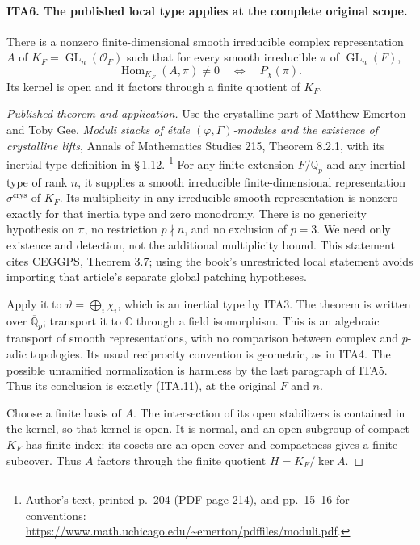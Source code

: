 \documentclass[11pt,a4paper]{article}
\numberwithin{equation}{section}
\theoremstyle{remark}\newtheorem{remark}[theorem]{Remark}
\begin{document}
\paragraph{ITA6. The published local type applies at the complete original scope.}
\label{claim:ITA6}
There is a nonzero finite-dimensional smooth irreducible complex
representation $A$ of $K_F=\operatorname{GL}_n(\mathcal O_F)$
such that for every smooth irreducible $\pi$ of
$\operatorname{GL}_n(F)$,
\[
             \operatorname{Hom}_{K_F}(A,\pi)\ne0
                         \quad\Longleftrightarrow\quad P_\chi(\pi).
                                                               \tag{ITA.11}
\]
Its kernel is open and it factors through a finite quotient of
$K_F$.
\begin{proof}[Published theorem and application]
Use the crystalline part of Matthew Emerton and Toby Gee,
\emph{Moduli stacks of \textup{\'etale} $(\varphi,\Gamma)$-modules
and the existence of crystalline lifts}, Annals of Mathematics
Studies 215, Theorem 8.2.1, with its inertial-type definition
in \S\,1.12.
\footnote{Author's text, printed p.~204 (PDF page 214),
and pp.~15--16 for conventions:
\url{https://www.math.uchicago.edu/~emerton/pdffiles/moduli.pdf}.}
For any finite extension $F/\mathbb Q_p$ and any inertial
type of rank $n$, it supplies a smooth irreducible
finite-dimensional representation $\sigma^{\mathrm{crys}}$
of $K_F$.  Its multiplicity in any irreducible smooth
representation is nonzero exactly for that inertia type
and zero monodromy.  There is no genericity hypothesis on
$\pi$, no restriction $p\nmid n$, and no exclusion of
$p=3$.  We need only existence and detection, not the
additional multiplicity bound.  This statement cites
CEGGPS, Theorem 3.7; using the book's unrestricted local
statement avoids importing that article's separate
global patching hypotheses.

Apply it to $\vartheta=\bigoplus_i\chi_i$, which is an
inertial type by ITA3.  The theorem is written over
$\overline{\mathbb Q}_p$; transport it to $\mathbb C$
through a field isomorphism.  This is an algebraic
transport of smooth representations, with no comparison
between complex and $p$-adic topologies.  Its usual
reciprocity convention is geometric, as in ITA4.
The possible unramified normalization is harmless by the
last paragraph of ITA5.  Thus its conclusion is exactly
(ITA.11), at the original $F$ and $n$.

Choose a finite basis of $A$.  The intersection of its
open stabilizers is contained in the kernel, so that
kernel is open.  It is normal, and an open subgroup
of compact $K_F$ has finite index: its cosets are an
open cover and compactness gives a finite subcover.
Thus $A$ factors through the finite quotient
$H=K_F/\ker A$.
\end{proof}
\end{document}
